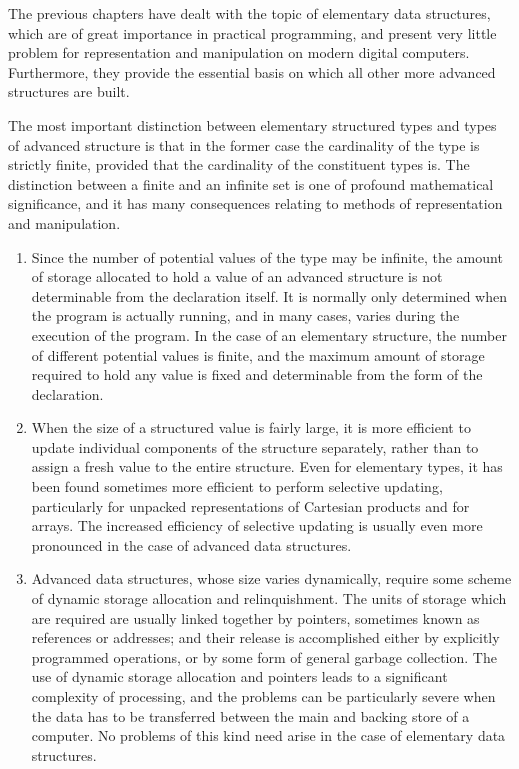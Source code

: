 \documentclass[twoside,11pt]{book}
\begin{document}
The previous chapters have dealt with the topic of elementary data structures, which are of great importance in practical programming,  and present very little problem for representation and manipulation on modern digital computers. Furthermore, they provide the essential basis on which all other more advanced structures are built.

The most important distinction between elementary structured types and types of advanced structure is that in the former case the cardinality of the type is strictly finite, provided that the cardinality of the constituent types is. The distinction between a finite and an infinite set is one of profound mathematical significance, and it has many consequences relating to methods of representation and manipulation.

\begin{enumerate}[wide, nosep, label=(\arabic*)]
	\item Since the number of potential values of the type may be infinite, the amount of storage allocated to hold a value of an advanced structure is not determinable from the declaration itself. It is normally only determined when the program is actually running, and in many cases, varies during the execution of the program. In the case of an elementary structure, the number of different potential values is finite, and the maximum amount of storage required to hold any value is fixed and determinable from the form of the declaration.

	\item When the size of a structured value is fairly large, it is more efficient to update individual components of the structure separately, rather than to assign a fresh value to the entire structure. Even for elementary types, it has been found sometimes more efficient to perform selective updating, particularly for unpacked representations of Cartesian products and for arrays. The increased efficiency of selective updating is usually even more pronounced in the case of advanced data structures.

	\item Advanced data structures, whose size varies dynamically, require some scheme of dynamic storage allocation and relinquishment. The units of storage which are required are usually linked together by pointers, sometimes known as references or addresses; and their release is accomplished either by explicitly programmed operations, or by some form of general garbage collection. The use of dynamic storage allocation and pointers leads to a significant complexity of processing, and the problems can be particularly severe when the data has to be transferred between the main and backing store of a computer. No problems of this kind need arise in the case of elementary data structures.


\end{enumerate}
\end{document}
